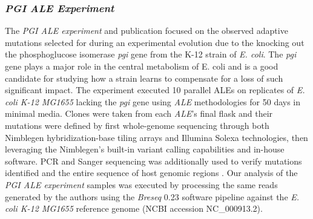 \documentclass[12pt,final,masters,chapterheads]{ucsd}  %
\begin{document}
\subsubsection{\textit{PGI} \textit{ALE Experiment}}
%
%
The \textit{PGI ALE experiment} and publication focused on the observed adaptive mutations selected for during an experimental evolution due to the knocking out the phosphoglucose isomerase \textit{pgi} gene from the K-12 strain of \textit{E. coli}. The \textit{pgi} gene plays a major role in the central metabolism of E. coli and is a good candidate for studying how a strain learns to compensate for a loss of such significant impact. The experiment executed 10 parallel ALEs on replicates of \textit{E. coli K-12 MG1655} lacking the \textit{pgi} gene using \textit{ALE} methodologies for 50 days in minimal media. Clones were taken from each \textit{ALE}'s final flask and their mutations were defined by first whole-genome sequencing through both Nimblegen hybridization-base tiling arrays and Illumina Solexa technologies, then leveraging the Nimblegen's built-in variant calling capabilities and in-house software. PCR and Sanger sequencing was additionally used to verify mutations identified and the entire sequence of host genomic regions \cite{10.1371/journal.pgen.1001186}. Our analysis of the \textit{PGI ALE experiment} samples was executed by processing the same reads generated by the authors using the \textit{Breseq} 0.23 software pipeline against the \textit{E. coli K-12 MG1655} reference genome (NCBI accession NC\_000913.2).
%
%
%
%
\end{document}
